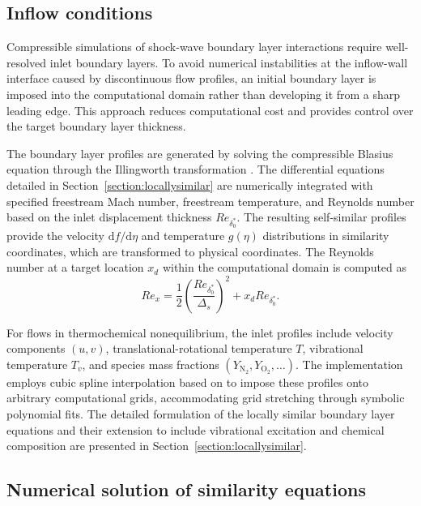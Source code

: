 \subsection{Inflow conditions}
Compressible simulations of shock-wave boundary layer interactions require well-resolved inlet boundary layers. To avoid numerical instabilities at the inflow-wall interface caused by discontinuous flow profiles, an initial boundary layer is imposed into the computational domain rather than developing it from a sharp leading edge. This approach reduces computational cost and provides control over the target boundary layer thickness.

The boundary layer profiles are generated by solving the compressible Blasius equation through the Illingworth transformation \citep{White2005}. The differential equations detailed in Section~\ref{section:locallysimilar} are numerically integrated with specified freestream Mach number, freestream temperature, and Reynolds number based on the inlet displacement thickness $Re_{\delta^{*}_{0}}$. The resulting self-similar profiles provide the velocity $\mathrm{d}f/\mathrm{d}\eta$ and temperature $g(\eta)$ distributions in similarity coordinates, which are transformed to physical coordinates. The Reynolds number at a target location $x_d$ within the computational domain is computed as
\begin{equation}
    Re_x = \frac{1}{2} \left( \frac{Re_{\delta^{*}_0}}{\Delta_s} \right )^2 + x_d Re_{\delta^{*}_{0}}.
\end{equation}

For flows in thermochemical nonequilibrium, the inlet profiles include velocity components $(u, v)$, translational-rotational temperature $T$, vibrational temperature $T_v$, and species mass fractions $(Y_{\mathrm{N}_2}, Y_{\mathrm{O}_2}, \ldots)$. The implementation employs cubic spline interpolation based on \citet{numericalrecipies2007} to impose these profiles onto arbitrary computational grids, accommodating grid stretching through symbolic polynomial fits. The detailed formulation of the locally similar boundary layer equations and their extension to include vibrational excitation and chemical composition are presented in Section~\ref{section:locallysimilar}. 


\subsection{Numerical solution of similarity equations}\label{section:similaritysolution}

